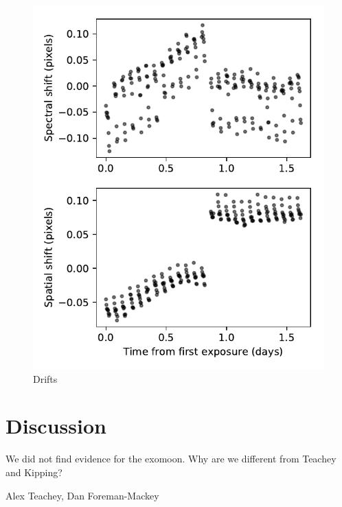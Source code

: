 \documentclass[twocolumn]{aastex62}
\begin{document}
\begin{figure}
\includegraphics[width = 0.5 \textwidth]{figures/fig4_shifts.pdf}
    \caption{ Drifts}
\label{fig:shifts}
\end{figure}


\section{Discussion}
We did not find evidence for the exomoon. Why are we different from Teachey and Kipping?

\acknowledgments
Alex Teachey, Dan Foreman-Mackey



\end{document}
